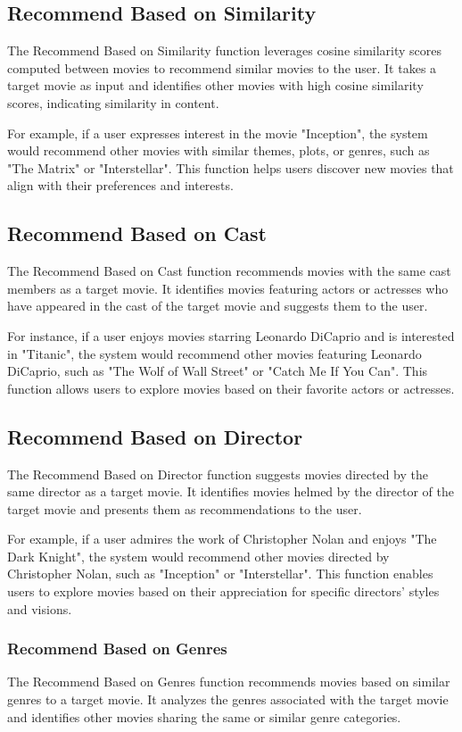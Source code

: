 \documentclass{article}
\begin{document}
\subsection{Recommend Based on Similarity}
The Recommend Based on Similarity function leverages cosine similarity scores computed between movies to recommend similar movies to the user. It takes a target movie as input and identifies other movies with high cosine similarity scores, indicating similarity in content.

For example, if a user expresses interest in the movie "Inception", the system would recommend other movies with similar themes, plots, or genres, such as "The Matrix" or "Interstellar". This function helps users discover new movies that align with their preferences and interests.

\subsection{Recommend Based on Cast}
The Recommend Based on Cast function recommends movies with the same cast members as a target movie. It identifies movies featuring actors or actresses who have appeared in the cast of the target movie and suggests them to the user.

For instance, if a user enjoys movies starring Leonardo DiCaprio and is interested in "Titanic", the system would recommend other movies featuring Leonardo DiCaprio, such as "The Wolf of Wall Street" or "Catch Me If You Can". This function allows users to explore movies based on their favorite actors or actresses.

\subsection{Recommend Based on Director}
The Recommend Based on Director function suggests movies directed by the same director as a target movie. It identifies movies helmed by the director of the target movie and presents them as recommendations to the user.

For example, if a user admires the work of Christopher Nolan and enjoys "The Dark Knight", the system would recommend other movies directed by Christopher Nolan, such as "Inception" or "Interstellar". This function enables users to explore movies based on their appreciation for specific directors' styles and visions.

\subsubsection{Recommend Based on Genres}
The Recommend Based on Genres function recommends movies based on similar genres to a target movie. It analyzes the genres associated with the target movie and identifies other movies sharing the same or similar genre categories.
\end{document}
